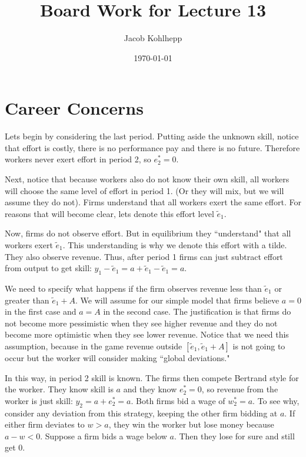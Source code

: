 \documentclass{article}
\title{Board Work for Lecture 13}
\author{Jacob Kohlhepp}
\date{\today}
\begin{document}
\maketitle


\section{Career Concerns}

Lets begin by considering the last period. Putting aside the unknown skill, notice that effort is costly, there is no performance pay and there is no future. Therefore workers never exert effort in period 2, so $e_2^*=0$.

Next, notice that because workers also do not know their own skill, all workers will choose the same level of effort in period 1. (Or they will mix, but we will assume they do not). Firms understand that all workers exert the same effort. For reasons that will become clear, lets denote this effort level $\tilde e_1$.

Now, firms do not observe effort. But in equilibrium they ``understand" that all workers exert $\tilde e_1$. This understanding is why we denote this effort with a tilde. They also observe revenue. Thus, after period 1 firms can just subtract effort from output to get skill: $y_1-\tilde e_1 =a+\tilde e_1 - \tilde e_1=a$.

We need to specify what happens if the firm observes revenue less than $\tilde e_1$ or greater than $\tilde e_1+A$. We will assume for our simple model that firms believe $a=0$ in the first case and $a=A$ in the second case. The justification is that firms do not become more pessimistic when they see higher revenue and they do not become more optimistic when they see lower revenue. Notice that we need this assumption, because in the game revenue outside $[\tilde e_1, \tilde e_1+A]$ is not going to occur but the worker will consider making ``global deviations." 

In this way, in period 2 skill is known. The firms then compete Bertrand style for the worker. They know skill is $a$ and they know $e_2^*=0$, so revenue from the worker is just skill: $y_2=a+e_2^*=a$. Both firms bid a wage of $w_2^*=a$. To see why, consider any deviation from this strategy, keeping the other firm bidding at $a$. If either firm deviates to $w>a$, they win the worker but lose money because $a-w<0$. Suppose a firm bids a wage below $a$. Then they lose for sure and still get 0.
\end{document}
